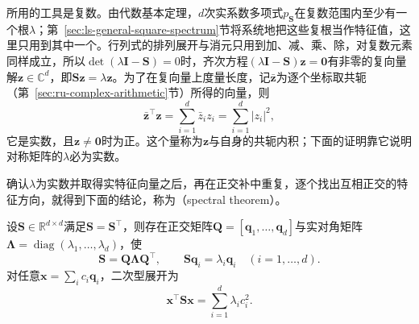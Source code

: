 所用的工具是复数。由代数基本定理，$d$次实系数多项式$p_{\bm S}$在复数范围内至少有一个根$\lambda$；第~\ref{sec:ls-general-square-spectrum}节将系统地把这些复根当作特征值，这里只用到其中一个。行列式的排列展开与消元只用到加、减、乘、除，对复数元素同样成立，所以$\det(\lambda\bm I-\bm S)=0$时，齐次方程$(\lambda\bm I-\bm S)\bm z=\bm0$有非零的复向量解$\bm z\in\mathbb C^d$，即$\bm S\bm z=\lambda\bm z$。为了在复向量上度量长度，记$\bar{\bm z}$为逐个坐标取共轭（第~\ref{sec:ru-complex-arithmetic}节）所得的向量，则
\[
 \bar{\bm z}^\top\bm z=\sum_{i=1}^d\bar z_iz_i=\sum_{i=1}^d|z_i|^2,
\]
它是实数，且$\bm z\neq\bm0$时为正。这个量称为$\bm z$与自身的共轭内积；下面的证明靠它说明对称矩阵的$\lambda$必为实数。

确认$\lambda$为实数并取得实特征向量之后，再在正交补中重复，逐个找出互相正交的特征方向，就得到下面的结论，称为（spectral theorem）。

\begin{theorem}[谱定理]
\label{thm:ls-real-symmetric-spectral}
\label{thm:matrix-analysis-symmetric-spectral-theorem}
\label{sec:ch06-triangular-spectrum}
设$\bm S\in\mathbb R^{d\times d}$满足$\bm S=\bm S^\top$，则存在正交矩阵$\bm Q=[\bm q_1,\ldots,\bm q_d]$与实对角矩阵$\bm\Lambda=\operatorname{diag}(\lambda_1,\dots,\lambda_d)$，使
\begin{equation}
 \bm S=\bm Q\bm\Lambda\bm Q^\top,\qquad \bm S\bm q_i=\lambda_i\bm q_i\quad(i=1,\ldots,d).
 \label{eq:matrix-analysis-symmetric-eigendecomposition}
\end{equation}
对任意$\bm x=\sum_i c_i\bm q_i$，二次型展开为
\begin{equation}
 \bm x^\top\bm S\bm x=\sum_{i=1}^d\lambda_i c_i^2.
 \label{eq:matrix-analysis-quadratic-spectral-form}
\end{equation}
\end{theorem}

